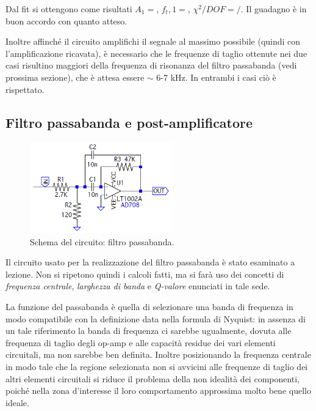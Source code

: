\documentclass[a4paper,10pt]{article}
\begin{document}
Dal fit si ottengono come risultati $A_1 = $, $f_t,1 = $, $\chi^2/DOF = /$. Il guadagno è in buon accordo con quanto atteso. 

Inoltre affinché il circuito amplifichi il segnale al massimo possibile (quindi con l'amplificazione ricavata), è necessario che le frequenze di taglio ottenute nei due casi risultino maggiori della frequenza di risonanza del filtro passabanda (vedi prossima sezione), che è attesa essere $\sim$ 6-7 kHz. In entrambi i casi ciò è rispettato.

\subsection{Filtro passabanda e post-amplificatore}

\begin{figure}
	\vspace{-10pt}
	\centering
	\includegraphics[width=0.55\textwidth]{../grafici/Bandpass.png}
	\vspace{-12pt}
	\caption{Schema del circuito: filtro passabanda.}
	\label{fig:bandpass}
	\vspace{-6pt}
\end{figure}

Il circuito usato per la realizzazione del filtro passabanda è stato esaminato a lezione. Non si ripetono quindi i calcoli fatti, ma si farà uso dei concetti di \textit{frequenza centrale}, \textit{larghezza di banda} e \textit{Q-valore} enunciati in tale sede.

La funzione del passabanda è quella di selezionare una banda di frequenza in modo compatibile con la definizione data nella formula di Nyquist: in assenza di un tale riferimento la banda di frequenza ci sarebbe ugualmente, dovuta alle frequenza di taglio degli op-amp e alle capacità residue dei vari elementi circuitali, ma non sarebbe ben definita.
Inoltre posizionando la frequenza centrale in modo tale che la regione selezionata non si avvicini alle frequenze di taglio dei altri elementi circuitali si riduce il problema della non idealità dei componenti, poiché nella zona d'interesse il loro comportamento approssima molto bene quello ideale.
\newline
\end{document}
